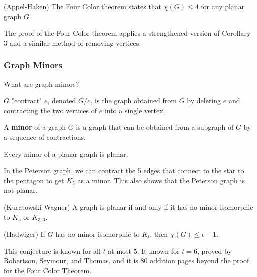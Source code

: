\begin{theorem}
	(Appel-Haken) The Four Color theorem states that \( \chi(G) \le 4 \) for any planar graph \( G \).
\end{theorem}

\begin{note}
	The proof of the Four Color theorem applies a strengthened version of Corollary 3 and a similar method of removing vertices.
\end{note}

\subsubsection{Graph Minors}

What are graph minors?

\begin{definition}
	\( G \) "contract" \( e \), denoted \( G / e \), is the graph obtained from \( G \) by deleting \( e \) and contracting the two vertices of \( e \) into a single vertex.
\end{definition}

\begin{definition}
	A \textbf{minor} of a graph \( G \) is a graph that can be obtained from a subgraph of \( G \) by a sequence of contractions.
\end{definition}

\begin{observe}
	Every minor of a planar graph is planar.
\end{observe}

\begin{eg}
	In the Peterson graph, we can contract the 5 edges that connect to the star to the pentagon to get \( K_5 \) as a minor. This also shows that the Peterson graph is not planar.
\end{eg}

\begin{theorem}
	(Kuratowski-Wagner) A graph is planar if and only if it has no minor isomorphic to \( K_5 \) or \( K_{3,3} \).
\end{theorem}

\begin{conjecture}
	(Hadwiger) If \( G \) has no minor isomorphic to \( K_t \), then \( \chi(G) \le t-1 \).
\end{conjecture}

\begin{note}
	This conjecture is known for all \( t \) at most 5. It known for \( t=6 \), proved by Robertson, Seymour, and Thomas, and it is 80 addition pages beyond the proof for the Four Color Theorem.
\end{note}
